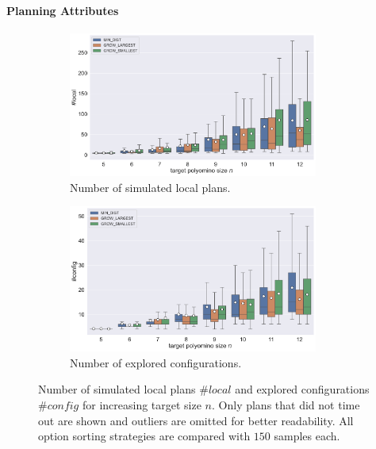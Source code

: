 \paragraph{Planning Attributes}

\begin{figure}
	\centering
	\begin{subfigure}[b]{\textwidth}
		\centering
		\includegraphics[width=0.9\textwidth]{figures/plots/AFN_nlocal.pdf}
		\caption{Number of simulated local plans.}
		\label{fig:AFN_nlocal}
	\end{subfigure}
	
	\begin{subfigure}[b]{\textwidth}
		\centering
		\includegraphics[width=0.9\textwidth]{figures/plots/AFN_nconfig.pdf}
		\caption{Number of explored configurations.}
		\label{fig:AFN_nconfig}
	\end{subfigure}
	\caption[Number of simulated local plans and explored configurations for increasing target size]{Number of simulated local plans $\#\textit{local}$ and explored configurations $\#\textit{config}$ for increasing target size $n$. Only plans that did not time out are shown and outliers are omitted for better readability. All option sorting strategies are compared with $150$ samples each.}
	\label{fig:AFN_planstats}
\end{figure}

